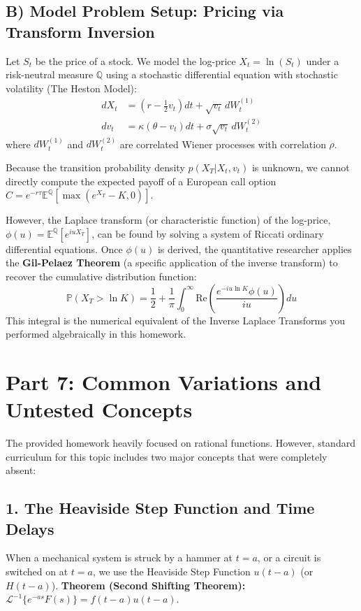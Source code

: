 \documentclass[11pt, a4paper]{article}
\theoremstyle{definition}
\theoremstyle{remark}
\newcommand{\E}{\mathbb{E}}
\newcommand{\Prob}{\mathbb{P}}
\newcommand{\InvLaplace}{\mathcal{L}^{-1}}
\begin{document}
\subsection{B) Model Problem Setup: Pricing via Transform Inversion}
Let $S_t$ be the price of a stock. We model the log-price $X_t = \ln(S_t)$ under a risk-neutral measure $\mathbb{Q}$ using a stochastic differential equation with stochastic volatility (The Heston Model):
\begin{align*}
    dX_t &= \left( r - \frac{1}{2}v_t \right) dt + \sqrt{v_t} \, dW_t^{(1)} \\
    dv_t &= \kappa(\theta - v_t) dt + \sigma \sqrt{v_t} \, dW_t^{(2)}
\end{align*}
where $dW_t^{(1)}$ and $dW_t^{(2)}$ are correlated Wiener processes with correlation $\rho$. 

Because the transition probability density $p(X_T | X_t, v_t)$ is unknown, we cannot directly compute the expected payoff of a European call option $C = e^{-r\tau} \E^\mathbb{Q}[\max(e^{X_T} - K, 0)]$. 

However, the Laplace transform (or characteristic function) of the log-price, $\phi(u) = \E^\mathbb{Q}[e^{iuX_T}]$, can be found by solving a system of Riccati ordinary differential equations. Once $\phi(u)$ is derived, the quantitative researcher applies the \textbf{Gil-Pelaez Theorem} (a specific application of the inverse transform) to recover the cumulative distribution function:
\[ \Prob(X_T > \ln K) = \frac{1}{2} + \frac{1}{\pi} \int_0^\infty \text{Re}\left( \frac{e^{-iu \ln K} \phi(u)}{iu} \right) du \]
This integral is the numerical equivalent of the Inverse Laplace Transforms you performed algebraically in this homework.

\newpage
\section{Part 7: Common Variations and Untested Concepts}

The provided homework heavily focused on rational functions. However, standard curriculum for this topic includes two major concepts that were completely absent:

\subsection{1. The Heaviside Step Function and Time Delays}
When a mechanical system is struck by a hammer at $t=a$, or a circuit is switched on at $t=a$, we use the Heaviside Step Function $u(t-a)$ (or $H(t-a)$). 
\textbf{Theorem (Second Shifting Theorem):} $\InvLaplace\{e^{-as}F(s)\} = f(t-a)u(t-a)$.
\end{document}
